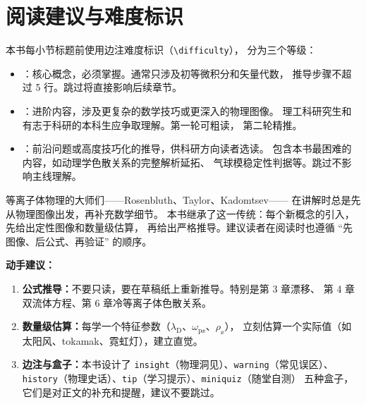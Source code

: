 \section*{阅读建议与难度标识}

本书每小节标题前使用边注难度标识（\texttt{\textbackslash difficulty}），
分为三个等级：

\begin{itemize}
\item \textbf{}：核心概念，必须掌握。通常只涉及初等微积分和矢量代数，
推导步骤不超过 5 行。跳过将直接影响后续章节。

\item \textbf{}：进阶内容，涉及更复杂的数学技巧或更深入的物理图像。
理工科研究生和有志于科研的本科生应争取理解。第一轮可粗读，
第二轮精推。

\item \textbf{}：前沿问题或高度技巧化的推导，供科研方向读者选读。
包含本书最困难的内容，如动理学色散关系的完整解析延拓、
气球模稳定性判据等。跳过不影响主线理解。
\end{itemize}

\begin{history}
等离子体物理的大师们——Rosenbluth、Taylor、Kadomtsev——
在讲解时总是先从物理图像出发，再补充数学细节。
本书继承了这一传统：每个新概念的引入，先给出定性图像和数量级估算，
再给出严格推导。建议读者在阅读时也遵循 ``先图像、后公式、再验证'' 的顺序。
\end{history}

\textbf{动手建议：}
\begin{enumerate}
\item \textbf{公式推导：}不要只读，要在草稿纸上重新推导。特别是第 3 章漂移、
第 4 章双流体方程、第 6 章冷等离子体色散关系。
\item \textbf{数量级估算：}每学一个特征参数（$\lambda_\mathrm{D}$、$\omega_{\mathrm{p}\ee}$、$\rho_\ee$），
立刻估算一个实际值（如太阳风、tokamak、霓虹灯），建立直觉。
\item \textbf{边注与盒子：}本书设计了 \texttt{insight}（物理洞见）、\texttt{warning}（常见误区）、
\texttt{history}（物理史话）、\texttt{tip}（学习提示）、\texttt{miniquiz}（随堂自测）
五种盒子，它们是对正文的补充和提醒，建议不要跳过。
\end{enumerate}


